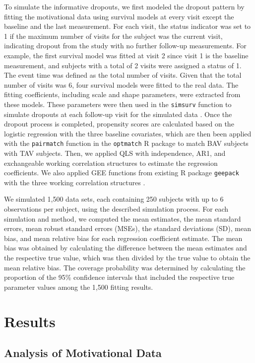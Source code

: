 \documentclass[
]{aft}
\begin{document}
To simulate the informative dropouts, we first modeled the dropout
pattern by fitting the motivational data using survival models at every
visit except the baseline and the last measurement. For each visit, the
status indicator was set to 1 if the maximum number of visits for the
subject was the current visit, indicating dropout from the study with no
further follow-up measurements. For example, the first survival model
was fitted at visit 2 since visit 1 is the baseline measurement, and
subjects with a total of 2 visits were assigned a status of 1. The event
time was defined as the total number of visits. Given that the total
number of visits was 6, four survival models were fitted to the real
data. The fitting coefficients, including scale and shape parameters,
were extracted from these models. These parameters were then used in the
\texttt{simsurv} function to simulate dropouts at each follow-up visit
for the simulated data \citep{simsurv20}. Once the dropout process is
completed, propensity scores are calculated based on the logistic
regression with the three baseline covariates, which are then been
applied with the \texttt{pairmatch} function in the \texttt{optmatch} R
package to match BAV subjects with TAV subjects. Then, we applied QLS
with independence, AR1, and exchangeable working correlation structures
to estimate the regression coefficients. We also applied GEE functions
from existing R package \texttt{geepack} with the three working
correlation structures \citep{Hojsgaard2006}.

We simulated 1,500 data sets, each containing 250 subjects with up to 6
observations per subject, using the described simulation process. For
each simulation and method, we computed the mean estimates, the mean
standard errors, mean robust standard errors (MSEs), the standard
deviations (SD), mean bias, and mean relative bias for each regression
coefficient estimate. The mean bias was obtained by calculating the
difference between the mean estimates and the respective true value,
which was then divided by the true value to obtain the mean relative
bias. The coverage probability was determined by calculating the
proportion of the 95\% confidence intervals that included the respective
true parameter values among the 1,500 fitting results.

\section{Results}\label{results}

\subsection{Analysis of Motivational
Data}\label{analysis-of-motivational-data}
\end{document}
